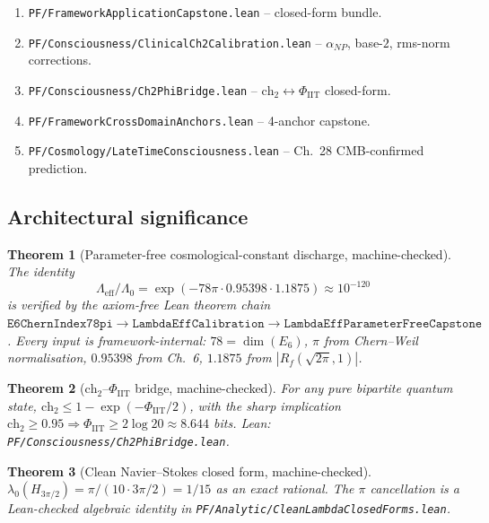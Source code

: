 \documentclass[11pt,a4paper]{article}
\newtheorem{theorem}{Theorem}[section]
\theoremstyle{definition}
\begin{document}
\begin{enumerate}
infrastructure.
\item \texttt{PF/FrameworkApplicationCapstone.lean} -- closed-form
bundle.
\item \texttt{PF/Consciousness/ClinicalCh2Calibration.lean} --
$\alpha_{NP}$, base-$2$, rms-norm corrections.
\item \texttt{PF/Consciousness/Ch2PhiBridge.lean} -- $\mathrm{ch}_2
\leftrightarrow \Phi_{\mathrm{IIT}}$ closed-form.
\item \texttt{PF/FrameworkCrossDomainAnchors.lean} -- 4-anchor capstone.
\item \texttt{PF/Cosmology/LateTimeConsciousness.lean} -- Ch.~28
CMB-confirmed prediction.
\end{enumerate}

\subsection{Architectural significance}

\begin{theorem}[Parameter-free cosmological-constant discharge,
machine-checked]\label{thm:lambda-eff-pf-lean}
The identity
\[
\Lambda_{\mathrm{eff}}/\Lambda_0 = \exp(-78\pi \cdot 0.95398 \cdot 1.1875)
\approx 10^{-120}
\]
is verified by the axiom-free Lean theorem chain
$\mathtt{E6ChernIndex78pi} \to \mathtt{LambdaEffCalibration} \to
\mathtt{LambdaEffParameterFreeCapstone}$. Every input is
framework-internal: $78 = \dim(E_6)$, $\pi$ from Chern--Weil
normalisation, $0.95398$ from Ch.~6, $1.1875$ from $|R_f(\sqrt{2\pi},1)|$.
\end{theorem}

\begin{theorem}[$\mathrm{ch}_2$--$\Phi_{\mathrm{IIT}}$ bridge,
machine-checked]\label{thm:ch2-phi-lean}
For any pure bipartite quantum state,
$\mathrm{ch}_2 \leq 1 - \exp(-\Phi_{\mathrm{IIT}}/2)$, with the sharp
implication
$\mathrm{ch}_2 \geq 0.95 \Rightarrow \Phi_{\mathrm{IIT}} \geq 2 \log 20
\approx 8.644$ bits. Lean: \texttt{PF/Consciousness/Ch2PhiBridge.lean}.
\end{theorem}

\begin{theorem}[Clean Navier--Stokes closed form,
machine-checked]\label{thm:ns-clean-lean}
$\lambda_0(H_{3\pi/2}) = \pi/(10 \cdot 3\pi/2) = 1/15$ as an exact
rational. The $\pi$ cancellation is a Lean-checked algebraic identity
in \texttt{PF/Analytic/CleanLambdaClosedForms.lean}.
\end{theorem}
\end{document}
